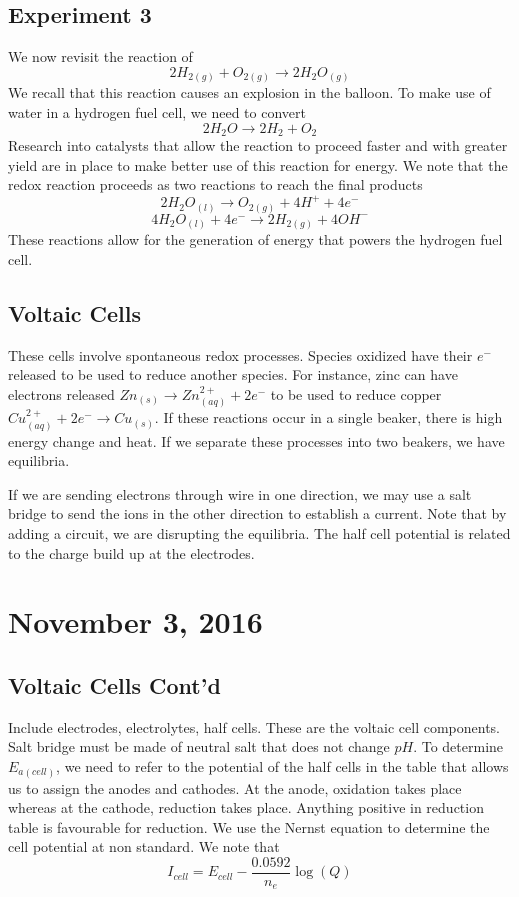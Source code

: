 \documentclass[11pt]{article}
\theoremstyle{plain} %
\theoremstyle{definition}
\theoremstyle{example}
\theoremstyle{remark}
\begin{document}
\subsection{Experiment 3}
We now revisit the reaction of $$2H_{2(g)} + O_{2(g)} \rightarrow 2H_2O_{(g)}$$ We recall that this reaction causes an explosion in the balloon. To make use of water in a hydrogen fuel cell, we need to convert $$2H_2O \rightarrow 2H_2 + O_2$$ Research into catalysts that allow the reaction to proceed faster and with greater yield are in place to make better use of this reaction for energy. We note that the redox reaction proceeds as two reactions to reach the final products
$$2 H_2O_{(l)} \rightarrow O_{2(g)} + 4H^+ + 4e^-$$
$$4H_2O_{(l)} + 4e^- \rightarrow 2H_{2(g)} + 4OH^-$$
These reactions allow for the generation of energy that powers the hydrogen fuel cell.

\subsection{Voltaic Cells}

These cells involve spontaneous redox processes. Species oxidized have their $e^-$ released to be used to reduce another species. For instance, zinc can have electrons released $Zn_{(s)} \rightarrow Zn_{(aq)}^{2+} + 2e^-$ to be used to reduce copper $Cu_{(aq)}^{2+} + 2e^- \rightarrow Cu_{(s)}$. If these reactions occur in a single beaker, there is high energy change and heat. If we separate these processes into two beakers, we have equilibria. 

If we are sending electrons through wire in one direction, we may use a salt bridge to send the ions in the other direction to establish a current. Note that by adding a circuit, we are disrupting the equilibria. The half cell potential is related to the charge build up at the electrodes. 

\section{November 3, 2016}
\subsection{Voltaic Cells Cont'd}

Include electrodes, electrolytes, half cells. These are the voltaic cell components. Salt bridge must be made of neutral salt that does not change $pH$. To determine $E_{a(cell)}$, we need to refer to the potential of the half cells in the table that allows us to assign the anodes and cathodes. At the anode, oxidation takes place whereas at the cathode, reduction takes place. 
Anything positive in reduction table is favourable for reduction. We use the Nernst equation to determine the cell potential at non standard. We note that $$I_{cell} = E_{cell} - \frac{0.0592}{n_e}\log(Q)$$
\end{document}
